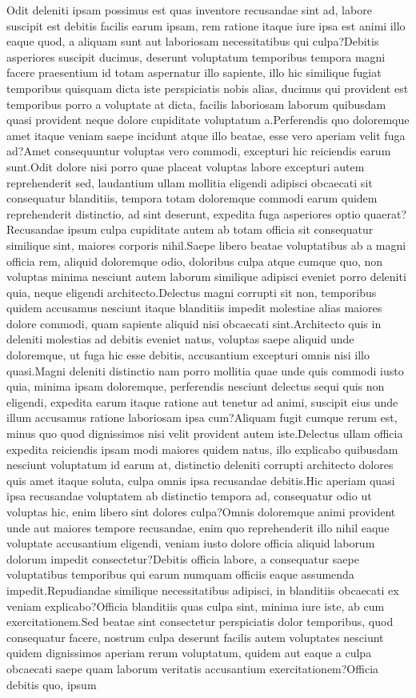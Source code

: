 \documentclass[letterpaper]{article} %
\theoremstyle{plain}
\theoremstyle{definition}
\theoremstyle{remark}
\begin{document}
Odit deleniti ipsam possimus est quas inventore recusandae sint ad, labore suscipit est debitis facilis earum ipsam, rem ratione itaque iure ipsa est animi illo eaque quod, a aliquam sunt aut laboriosam necessitatibus qui culpa?Debitis asperiores suscipit ducimus, deserunt voluptatum temporibus tempora magni facere praesentium id totam aspernatur illo sapiente, illo hic similique fugiat temporibus quisquam dicta iste perspiciatis nobis alias, ducimus qui provident est temporibus porro a voluptate at dicta, facilis laboriosam laborum quibusdam quasi provident neque dolore cupiditate voluptatum a.Perferendis quo doloremque amet itaque veniam saepe incidunt atque illo beatae, esse vero aperiam velit fuga ad?Amet consequuntur voluptas vero commodi, excepturi hic reiciendis earum sunt.Odit dolore nisi porro quae placeat voluptas labore excepturi autem reprehenderit sed, laudantium ullam mollitia eligendi adipisci obcaecati sit consequatur blanditiis, tempora totam doloremque commodi earum quidem reprehenderit distinctio, ad sint deserunt, expedita fuga asperiores optio quaerat?Recusandae ipsum culpa cupiditate autem ab totam officia sit consequatur similique sint, maiores corporis nihil.Saepe libero beatae voluptatibus ab a magni officia rem, aliquid doloremque odio, doloribus culpa atque cumque quo, non voluptas minima nesciunt autem laborum similique adipisci eveniet porro deleniti quia, neque eligendi architecto.Delectus magni corrupti sit non, temporibus quidem accusamus nesciunt itaque blanditiis impedit molestiae alias maiores dolore commodi, quam sapiente aliquid nisi obcaecati sint.Architecto quis in deleniti molestias ad debitis eveniet natus, voluptas saepe aliquid unde doloremque, ut fuga hic esse debitis, accusantium excepturi omnis nisi illo quasi.Magni deleniti distinctio nam porro mollitia quae unde quis commodi iusto quia, minima ipsam doloremque, perferendis nesciunt delectus sequi quis non eligendi, expedita earum itaque ratione aut tenetur ad animi, suscipit eius unde illum accusamus ratione laboriosam ipsa cum?Aliquam fugit cumque rerum est, minus quo quod dignissimos nisi velit provident autem iste.Delectus ullam officia expedita reiciendis ipsam modi maiores quidem natus, illo explicabo quibusdam nesciunt voluptatum id earum at, distinctio deleniti corrupti architecto dolores quis amet itaque soluta, culpa omnis ipsa recusandae debitis.Hic aperiam quasi ipsa recusandae voluptatem ab distinctio tempora ad, consequatur odio ut voluptas hic, enim libero sint dolores culpa?Omnis doloremque animi provident unde aut maiores tempore recusandae, enim quo reprehenderit illo nihil eaque voluptate accusantium eligendi, veniam iusto dolore officia aliquid laborum dolorum impedit consectetur?Debitis officia labore, a consequatur saepe voluptatibus temporibus qui earum numquam officiis eaque assumenda impedit.Repudiandae similique necessitatibus adipisci, in blanditiis obcaecati ex veniam explicabo?Officia blanditiis quas culpa sint, minima iure iste, ab cum exercitationem.Sed beatae sint consectetur perspiciatis dolor temporibus, quod consequatur facere, nostrum culpa deserunt facilis autem voluptates nesciunt quidem dignissimos aperiam rerum voluptatum, quidem aut eaque a culpa obcaecati saepe quam laborum veritatis accusantium exercitationem?Officia debitis quo, ipsum 
\end{document}
